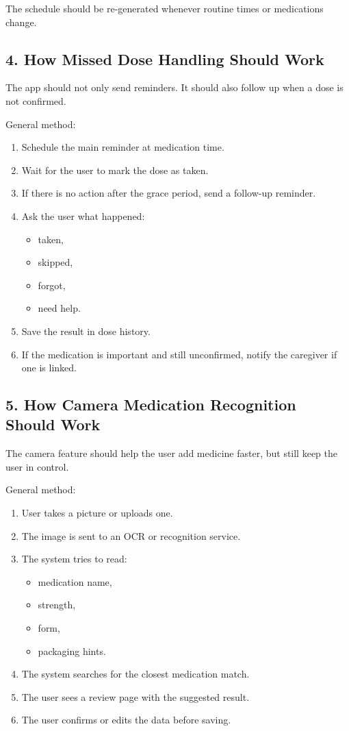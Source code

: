 \documentclass[11pt,a4paper]{article}
\begin{document}
The schedule should be re-generated whenever routine times or medications change.

\subsection{4. How Missed Dose Handling Should Work}
The app should not only send reminders. It should also follow up when a dose is not confirmed.

General method:
\begin{enumerate}
    \item Schedule the main reminder at medication time.
    \item Wait for the user to mark the dose as taken.
    \item If there is no action after the grace period, send a follow-up reminder.
    \item Ask the user what happened:
    \begin{itemize}
        \item taken,
        \item skipped,
        \item forgot,
        \item need help.
    \end{itemize}
    \item Save the result in dose history.
    \item If the medication is important and still unconfirmed, notify the caregiver if one is linked.
\end{enumerate}

\subsection{5. How Camera Medication Recognition Should Work}
The camera feature should help the user add medicine faster, but still keep the user in control.

General method:
\begin{enumerate}
    \item User takes a picture or uploads one.
    \item The image is sent to an OCR or recognition service.
    \item The system tries to read:
    \begin{itemize}
        \item medication name,
        \item strength,
        \item form,
        \item packaging hints.
    \end{itemize}
    \item The system searches for the closest medication match.
    \item The user sees a review page with the suggested result.
    \item The user confirms or edits the data before saving.
\end{enumerate}
\end{document}
